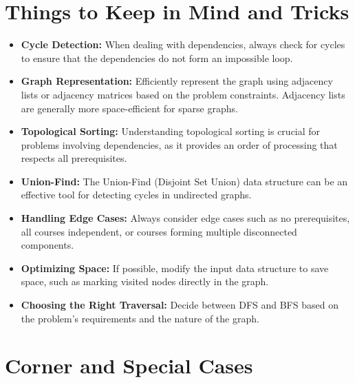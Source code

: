 \section*{Things to Keep in Mind and Tricks}

\begin{itemize}
    \item \textbf{Cycle Detection:} When dealing with dependencies, always check for cycles to ensure that the dependencies do not form an impossible loop.
    
    \item \textbf{Graph Representation:} Efficiently represent the graph using adjacency lists or adjacency matrices based on the problem constraints. Adjacency lists are generally more space-efficient for sparse graphs.
    
    \item \textbf{Topological Sorting:} Understanding topological sorting is crucial for problems involving dependencies, as it provides an order of processing that respects all prerequisites.
    
    \item \textbf{Union-Find:} The Union-Find (Disjoint Set Union) data structure can be an effective tool for detecting cycles in undirected graphs.
    
    \item \textbf{Handling Edge Cases:} Always consider edge cases such as no prerequisites, all courses independent, or courses forming multiple disconnected components.
    
    \item \textbf{Optimizing Space:} If possible, modify the input data structure to save space, such as marking visited nodes directly in the graph.
    
    \item \textbf{Choosing the Right Traversal:} Decide between DFS and BFS based on the problem's requirements and the nature of the graph.
\end{itemize}

\section*{Corner and Special Cases}

